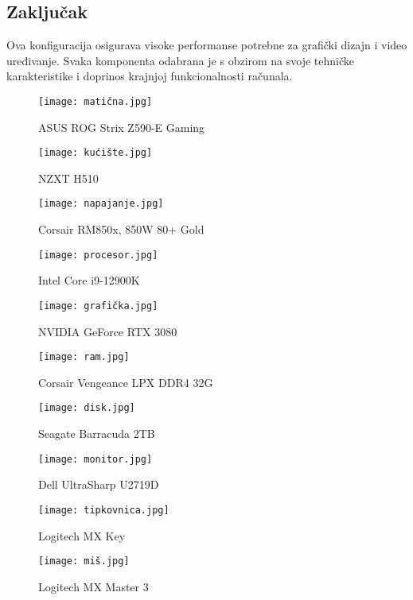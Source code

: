 \documentclass{article}
\begin{document}
\begin{itemize}
\section*{Zaključak}
Ova konfiguracija osigurava visoke performanse potrebne za grafički dizajn i video uređivanje. Svaka komponenta odabrana je s obzirom na svoje tehničke karakteristike i doprinos krajnjoj funkcionalnosti računala.

\begin{figure}[htbp]
  \centering
  \texttt{[image: matična.jpg]}
  \caption{ASUS ROG Strix Z590-E Gaming}
\end{figure}

\begin{figure}[htbp]
  \centering
  \texttt{[image: kućište.jpg]}
  \caption{NZXT H510}
\end{figure}

\begin{figure}[htbp]
  \centering
  \texttt{[image: napajanje.jpg]}
  \caption{Corsair RM850x, 850W 80+ Gold}
\end{figure}

\begin{figure}[htbp]
  \centering
  \texttt{[image: procesor.jpg]}
  \caption{Intel Core i9-12900K}
\end{figure}

\begin{figure}[htbp]
  \centering
  \texttt{[image: grafička.jpg]}
  \caption{NVIDIA GeForce RTX 3080}
\end{figure}

\begin{figure}[htbp]
  \centering
  \texttt{[image: ram.jpg]}
  \caption{Corsair Vengeance LPX DDR4 32G}
\end{figure}

\begin{figure}[htbp]
  \centering
  \texttt{[image: disk.jpg]}
  \caption{Seagate Barracuda 2TB}
\end{figure}

\begin{figure}[htbp]
  \centering
  \texttt{[image: monitor.jpg]}
  \caption{Dell UltraSharp U2719D}
\end{figure}

\begin{figure}[htbp]
  \centering
  \texttt{[image: tipkovnica.jpg]}
  \caption{Logitech MX Key}
\end{figure}

\begin{figure}[htbp]
  \centering
  \texttt{[image: miš.jpg]}
  \caption{Logitech MX Master 3}
\end{figure}

\end{itemize}
\end{document}
